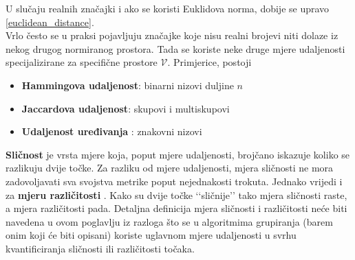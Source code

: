 \documentclass[times, utf8, zavrsni]{fer}
\begin{document}
U slučaju realnih značajki i ako se koristi Euklidova norma, dobije se upravo \ref{euclidean_distance}.\\
Vrlo često se u praksi pojavljuju značajke koje nisu realni brojevi niti dolaze iz nekog drugog normiranog prostora. Tada se koriste neke druge mjere udaljenosti specijalizirane za specifične prostore \(\mathcal{V}\). Primjerice, postoji
\begin{itemize}
    \item \textbf{Hammingova udaljenost}: binarni nizovi duljine $n$
    \item \textbf{Jaccardova udaljenost}: skupovi i multiskupovi
    \item \textbf{Udaljenost uređivanja} : znakovni nizovi
\end{itemize}
\textbf{Sličnost}  je vrsta mjere koja, poput mjere udaljenosti, brojčano iskazuje koliko se razlikuju dvije točke. Za razliku od mjere udaljenosti, mjera sličnosti ne mora zadovoljavati sva svojstva metrike poput nejednakosti trokuta. Jednako vrijedi i za \textbf{mjeru različitosti} . Kako su dvije točke ‘‘sličnije’’ tako mjera sličnosti raste, a mjera različitosti pada. Detaljna definicija mjera sličnosti i različitosti neće biti navedena u ovom poglavlju iz razloga što se u algoritmima grupiranja (barem onim koji će biti opisani) koriste uglavnom mjere udaljenosti u svrhu kvantificiranja sličnosti ili različitosti točaka.
\end{document}
